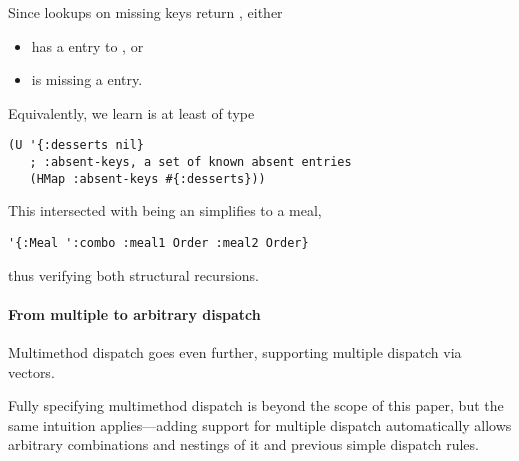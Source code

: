 Since lookups on missing keys return , either
\begin{itemize}
  \item {} has a  entry to , or
  \item {} is missing a  entry.
\end{itemize}
Equivalently, we learn  is at least of type
\begin{verbatim}
(U '{:desserts nil}
   ; :absent-keys, a set of known absent entries
   (HMap :absent-keys #{:desserts}))
\end{verbatim}
This intersected with  being an  simplifies to a  meal, 
\begin{verbatim}
'{:Meal ':combo :meal1 Order :meal2 Order}
\end{verbatim}
thus verifying both structural recursions.

\paragraph{From multiple to arbitrary dispatch}
Multimethod dispatch goes even further, supporting
multiple dispatch via vectors.

Fully specifying multimethod dispatch is beyond the scope of this paper,
but the same intuition applies---adding support for multiple dispatch
automatically allows arbitrary combinations and nestings
of it and previous simple dispatch rules.

%
%

